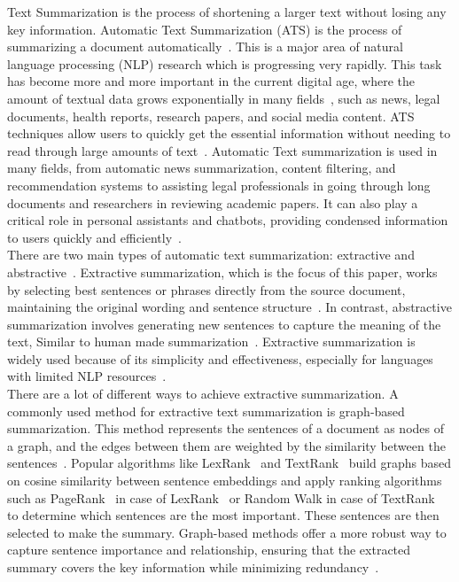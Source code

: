 Text Summarization is the process of shortening a larger text without losing any key information.
Automatic Text Summarization (ATS) is the process of summarizing a document
automatically~\cite{Widyassari-2022-rev-ats-tech-met}.
This is a major area of natural language processing (NLP) research which is progressing very rapidly.
This task has become more and more important in the current digital age, where the amount of textual
data grows exponentially in many fields~\cite{2015-Forbes-80-created-last-2-years},
such as news, legal documents, health reports, research papers, and social media content.
ATS techniques allow users to quickly get the essential information without needing to read through large
amounts of text~\cite{wafaa-2021-summary-comprehensive-review}.
Automatic Text summarization is used in many fields, from automatic news summarization, content filtering, and recommendation
systems to assisting legal professionals in going through long documents and researchers in reviewing academic papers.
It can also play a critical role in personal assistants and chatbots, providing condensed information to users quickly
and efficiently~\cite{tas-2017-rev-text-sum-2}.\\

There are two main types of automatic text summarization: extractive and abstractive~\cite{tas-2017-rev-text-sum-2}.
Extractive summarization, which is the focus of this paper, works by selecting best sentences or phrases directly
from the source document, maintaining the original wording and sentence structure~\cite{moratanch-2017-extractive-review}.
In contrast, abstractive summarization involves generating new sentences to capture the meaning of the
text, Similar to human made summarization~\cite{Moratanch-2016-abstractive-rev}.
Extractive summarization is widely used because of its simplicity and effectiveness, especially for languages with
limited NLP resources~\cite{gupta-2010-extractive-rev}.\\

There are a lot of different ways to achieve extractive summarization.
A commonly used method for extractive text summarization is graph-based summarization.
This method represents the sentences of a document as nodes of a graph, and the edges between them are weighted by the
similarity between the sentences~\cite{wafaa-2021-summary-comprehensive-review}.
Popular algorithms like LexRank~\cite{Erkan-lexRank-2004} and TextRank~\cite{mihalcea-2004-textrank} build graphs based
on cosine similarity between sentence embeddings and apply ranking algorithms such as PageRank~\cite{page-PageRank-1999} in
case of LexRank~\cite{Erkan-lexRank-2004} or Random Walk in case of TextRank~\cite{mihalcea-2004-textrank} to
determine which sentences are the most important.
These sentences are then selected to make the summary.
Graph-based methods offer a more robust way to capture sentence importance and relationship, ensuring that the
extracted summary covers the key information while minimizing redundancy~\cite{wafaa-2021-summary-comprehensive-review}.\\

